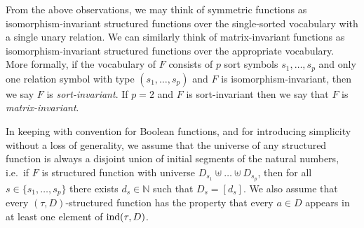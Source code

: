 \documentclass[../paper.tex]{subfiles}
\begin{document}
From the above observations, we may think of symmetric functions as
isomorphism-invariant structured functions over the single-sorted vocabulary with
a single unary relation. We can similarly think of matrix-invariant functions as
isomorphism-invariant structured functions over the appropriate vocabulary. More
formally, if the vocabulary of $F$ consists of $p$ sort symbols $s_1, \ldots ,
s_p$ and only one relation symbol with type $(s_1, \ldots, s_p)$ and $F$ is
isomorphism-invariant, then we say $F$ is \emph{sort-invariant}. If $p = 2$ and
$F$ is sort-invariant then we say that $F$ is \emph{matrix-invariant}.

In keeping with convention for Boolean functions, and for introducing simplicity
without a loss of generality, we assume that the universe of any structured
function is always a disjoint union of initial segments of the natural
numbers, i.e.\ if $F$ is structured function with universe $D_{s_1} \uplus \ldots
\uplus D_{s_p}$, then for all $s \in \{s_1 , \ldots , s_p\}$ there exists $d_s \in \mathbb{N}$ such
that $D_{s} = [d_s]$. We also assume that every $(\tau, D)$-structured function has the property that every $a \in D$ appears in at least one element of $\text{\upshape ind}(\tau, D)$.







\end{document}
